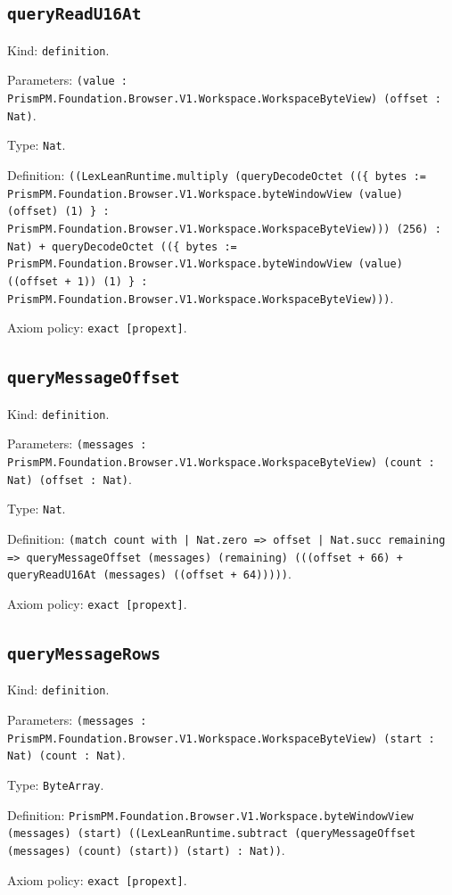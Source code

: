 \documentclass[11pt]{article}
\begin{document}
\subsection*{\texttt{queryReadU16At}}
\noindent Kind: \texttt{definition}.\par
\noindent Parameters: \texttt{(value : PrismPM.Foundation.Browser.V1.Workspace.WorkspaceByteView) (offset : Nat)}.\par
\noindent Type: \texttt{Nat}.\par
\noindent Definition: \texttt{((LexLeanRuntime.multiply (queryDecodeOctet ((\{ bytes := PrismPM.Foundation.Browser.V1.Workspace.byteWindowView (value) (offset) (1) \} : PrismPM.Foundation.Browser.V1.Workspace.WorkspaceByteView))) (256) : Nat) + queryDecodeOctet ((\{ bytes := PrismPM.Foundation.Browser.V1.Workspace.byteWindowView (value) ((offset + 1)) (1) \} : PrismPM.Foundation.Browser.V1.Workspace.WorkspaceByteView)))}.\par
\noindent Axiom policy: \texttt{exact [propext]}.\par
\subsection*{\texttt{queryMessageOffset}}
\noindent Kind: \texttt{definition}.\par
\noindent Parameters: \texttt{(messages : PrismPM.Foundation.Browser.V1.Workspace.WorkspaceByteView) (count : Nat) (offset : Nat)}.\par
\noindent Type: \texttt{Nat}.\par
\noindent Definition: \texttt{(match count with | Nat.zero => offset | Nat.succ remaining => queryMessageOffset (messages) (remaining) (((offset + 66) + queryReadU16At (messages) ((offset + 64)))))}.\par
\noindent Axiom policy: \texttt{exact [propext]}.\par
\subsection*{\texttt{queryMessageRows}}
\noindent Kind: \texttt{definition}.\par
\noindent Parameters: \texttt{(messages : PrismPM.Foundation.Browser.V1.Workspace.WorkspaceByteView) (start : Nat) (count : Nat)}.\par
\noindent Type: \texttt{ByteArray}.\par
\noindent Definition: \texttt{PrismPM.Foundation.Browser.V1.Workspace.byteWindowView (messages) (start) ((LexLeanRuntime.subtract (queryMessageOffset (messages) (count) (start)) (start) : Nat))}.\par
\noindent Axiom policy: \texttt{exact [propext]}.\par
\end{document}
